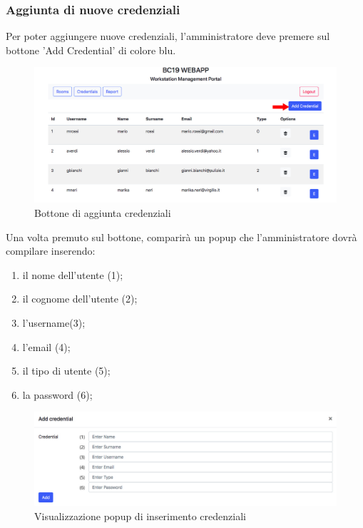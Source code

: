 \subsubsection{Aggiunta di nuove credenziali}
Per poter aggiungere nuove credenziali, l'amministratore deve premere sul bottone 'Add Credential' di colore blu.
\begin{figure}[H]
	\centering
	\includegraphics[width=15cm]{res/images/addCredential.jpg}
	\caption{Bottone di aggiunta credenziali}
\end{figure}
Una volta premuto sul bottone, comparirà un popup che l'amministratore dovrà compilare inserendo:
\begin{enumerate}
\item il nome dell'utente (1);
\item il cognome dell'utente (2);
\item l'username(3);
\item l'email (4);
\item il tipo di utente (5);
\item la password (6);
\end{enumerate}
\begin{figure}[H]
	\centering
	\includegraphics[width=15cm]{res/images/addc.jpg}
	\caption{Visualizzazione popup di inserimento credenziali}
\end{figure}


